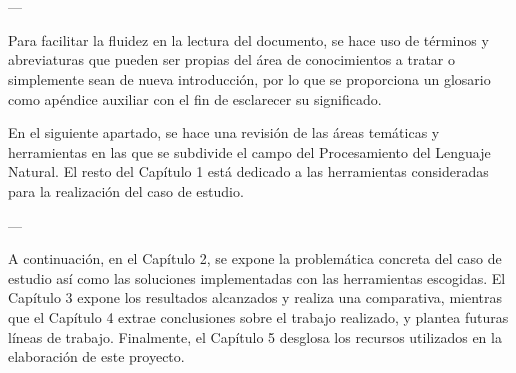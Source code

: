 \chapter{\ChapterOne{}}



---

Para facilitar la fluidez en la lectura del documento, se hace uso de términos y abreviaturas que pueden ser propias del área de conocimientos a tratar o simplemente sean de nueva introducción, por lo que se proporciona un glosario como apéndice auxiliar con el fin de esclarecer su significado.

En el siguiente apartado, se hace una revisión de las áreas temáticas y herramientas en las que se subdivide el campo del Procesamiento del Lenguaje Natural. El resto del Capítulo 1 está dedicado a las herramientas consideradas para la realización del caso de estudio.







---

A continuación, en el Capítulo 2, se expone la problemática concreta del caso de estudio así como las soluciones implementadas con las herramientas escogidas. El Capítulo 3 expone los resultados alcanzados y realiza una comparativa, mientras que el Capítulo 4 extrae conclusiones sobre el trabajo realizado, y plantea futuras líneas de trabajo. Finalmente, el Capítulo 5 desglosa los recursos utilizados en la elaboración de este proyecto.